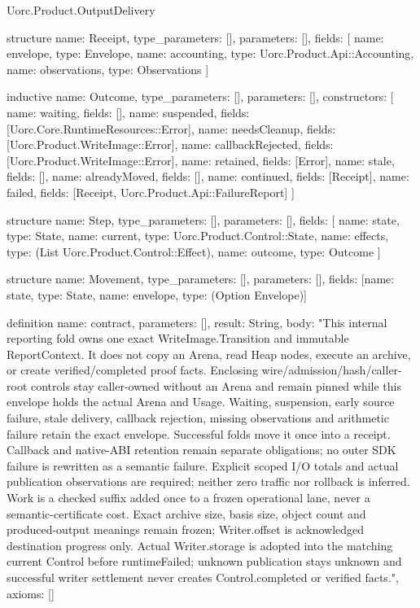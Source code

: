 \begin{lexlean}{Uorc.Product.OutputDelivery}
\begin{semanticmodule}
structure{
  name: Receipt,
  type_parameters: [],
  parameters: [],
  fields: [
    {name: envelope, type: Envelope},
    {name: accounting, type: Uorc.Product.Api::Accounting},
    {name: observations, type: Observations}
  ]
}

inductive{
  name: Outcome,
  type_parameters: [],
  parameters: [],
  constructors: [
    {name: waiting, fields: []},
    {name: suspended, fields: [Uorc.Core.RuntimeResources::Error]},
    {name: needsCleanup, fields: [Uorc.Product.WriteImage::Error]},
    {name: callbackRejected, fields: [Uorc.Product.WriteImage::Error]},
    {name: retained, fields: [Error]},
    {name: stale, fields: []},
    {name: alreadyMoved, fields: []},
    {name: continued, fields: [Receipt]},
    {name: failed, fields: [Receipt, Uorc.Product.Api::FailureReport]}
  ]
}

structure{
  name: Step,
  type_parameters: [],
  parameters: [],
  fields: [
    {name: state, type: State},
    {name: current, type: Uorc.Product.Control::State},
    {name: effects, type: (List Uorc.Product.Control::Effect)},
    {name: outcome, type: Outcome}
  ]
}

structure{
  name: Movement,
  type_parameters: [],
  parameters: [],
  fields: [{name: state, type: State}, {name: envelope, type: (Option Envelope)}]
}

definition{
  name: contract,
  parameters: [],
  result: String,
  body: "This internal reporting fold owns one exact WriteImage.Transition and immutable ReportContext. It does not copy an Arena, read Heap nodes, execute an archive, or create verified/completed proof facts. Enclosing wire/admission/hash/caller-root controls stay caller-owned without an Arena and remain pinned while this envelope holds the actual Arena and Usage. Waiting, suspension, early source failure, stale delivery, callback rejection, missing observations and arithmetic failure retain the exact envelope. Successful folds move it once into a receipt. Callback and native-ABI retention remain separate obligations; no outer SDK failure is rewritten as a semantic failure. Explicit scoped I/O totals and actual publication observations are required; neither zero traffic nor rollback is inferred. Work is a checked suffix added once to a frozen operational lane, never a semantic-certificate cost. Exact archive size, basis size, object count and produced-output meanings remain frozen; Writer.offset is acknowledged destination progress only. Actual Writer.storage is adopted into the matching current Control before runtimeFailed; unknown publication stays unknown and successful writer settlement never creates Control.completed or verified facts.",
  axioms: []
}


\end{semanticmodule}
\end{lexlean}
